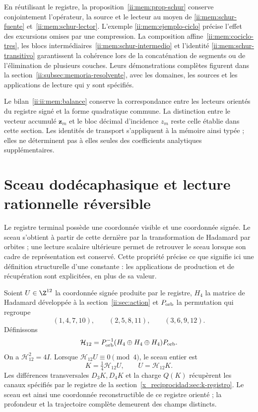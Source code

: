 En réutilisant le registre, la proposition~\ref{ii:mem:prop-schur} conserve
conjointement l’opérateur, la source et le lecteur au moyen de
\eqref{ii:mem:schur-fuente} et~\eqref{ii:mem:schur-lector}. L’exemple
\eqref{ii:mem:ejemplo-ciclo} précise l’effet des excursions omises
par une compression. La composition affine~\eqref{ii:mem:cociclo-tres}, les
blocs intermédiaires~\eqref{ii:mem:schur-intermedio} et l’identité
\eqref{ii:mem:schur-transitivo} garantissent la cohérence lors de la concaténation de
segments ou de l’élimination de plusieurs couches. Leurs démonstrations complètes figurent
dans la section~\ref{ii:subsec:memoria-resolvente}, avec les domaines, les
sources et les applications de lecture qui y sont spécifiés.

Le bilan~\eqref{ii:ii:mem:balance} conserve la correspondance entre les
lecteurs orientés du registre signé et la forme quadratique commune.
La distinction entre le vecteur accumulé \(\mathbf z_m\) et le bloc
décimal d’incidence \(z_m\) reste celle établie dans cette section.
Les identités de transport s’appliquent à la mémoire ainsi typée ; elles ne
déterminent pas à elles seules des coefficients analytiques supplémentaires.




\section{Sceau dodécaphasique et lecture rationnelle réversible}
\label{ii:sec:sello}

Le registre terminal possède une coordonnée visible et une coordonnée
signée. Le sceau s'obtient à partir de cette dernière par la transformation
de Hadamard par orbites ; une lecture scalaire ultérieure permet de retrouver
le sceau lorsque son cadre de représentation est conservé. Cette propriété
précise ce que signifie ici une définition structurelle d'une constante :
les applications de production et de récupération sont explicitées, en plus de sa valeur.

Soient $U\in\Z^{12}$ la coordonnée signée produite par le registre,
$H_4$ la matrice de Hadamard développée à la section~\ref{ii:sec:action}
et $P_{\rm orb}$ la permutation qui regroupe
\[
 (1,4,7,10),\qquad(2,5,8,11),\qquad(3,6,9,12).
\]
Définissons
\[
 \mathcal H_{12}=P_{\rm orb}^{-1}
 (H_4\oplus H_4\oplus H_4)P_{\rm orb}.
\]
On a $\mathcal H_{12}^2=4I$. Lorsque
$\mathcal H_{12}U\equiv0\pmod4$, le sceau entier est
\[
 K=\tfrac14\mathcal H_{12}U,
 \qquad U=\mathcal H_{12}K.
\]
Les différences transversales $D_3K,D_4K$ et la charge $Q(K)$ récupèrent les canaux spécifiés par le registre de la section~\ref{x_reciprocidad:sec:k-registro}. Le sceau est ainsi une coordonnée reconstructible de ce registre orienté ; la profondeur et la trajectoire complète demeurent des champs distincts.

